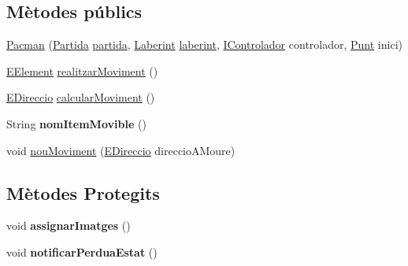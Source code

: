 \subsection*{Mètodes públics}
\begin{DoxyCompactItemize}
\item 
\hyperlink{classlogica_1_1_pacman_a4c8cd3d9c43aba9d2a944af0afe74ac2}{Pacman} (\hyperlink{classlogica_1_1_partida}{Partida} \hyperlink{classlogica_1_1_item_movible_ace55b4918a7f671f89ed3109c91359e4}{partida}, \hyperlink{classlogica_1_1laberints_1_1_laberint}{Laberint} \hyperlink{classlogica_1_1_item_movible_a97036130b7376d77776427ca126f6fb5}{laberint}, \hyperlink{interfacelogica_1_1controladors__pacman_1_1_i_controlador}{I\+Controlador} controlador, \hyperlink{classlogica_1_1_punt}{Punt} inici)
\item 
\hyperlink{enumlogica_1_1enumeracions_1_1_e_element}{E\+Element} \hyperlink{classlogica_1_1_pacman_aa93e730a6089b7670e3b4b20944a7893}{realitzar\+Moviment} ()
\item 
\hyperlink{enumlogica_1_1enumeracions_1_1_e_direccio}{E\+Direccio} \hyperlink{classlogica_1_1_pacman_a4aed3d640e73f08aa1183f9c07b8fc13}{calcular\+Moviment} ()
\item 
\hypertarget{classlogica_1_1_pacman_a647d372ea38d2eb89e2be24277c70f6a}{String {\bfseries nom\+Item\+Movible} ()}\label{classlogica_1_1_pacman_a647d372ea38d2eb89e2be24277c70f6a}

\item 
void \hyperlink{classlogica_1_1_pacman_af0a24ddada5f8bb327e8dd413478a8a8}{nou\+Moviment} (\hyperlink{enumlogica_1_1enumeracions_1_1_e_direccio}{E\+Direccio} direccio\+A\+Moure)
\end{DoxyCompactItemize}
\subsection*{Mètodes Protegits}
\begin{DoxyCompactItemize}
\item 
\hypertarget{classlogica_1_1_pacman_aa380057c9914d883c00e84356ce71f45}{void {\bfseries assignar\+Imatges} ()}\label{classlogica_1_1_pacman_aa380057c9914d883c00e84356ce71f45}

\item 
\hypertarget{classlogica_1_1_pacman_a7b61e5651dd8bbcbc48f869a66c75013}{void {\bfseries notificar\+Perdua\+Estat} ()}\label{classlogica_1_1_pacman_a7b61e5651dd8bbcbc48f869a66c75013}

\end{DoxyCompactItemize}
